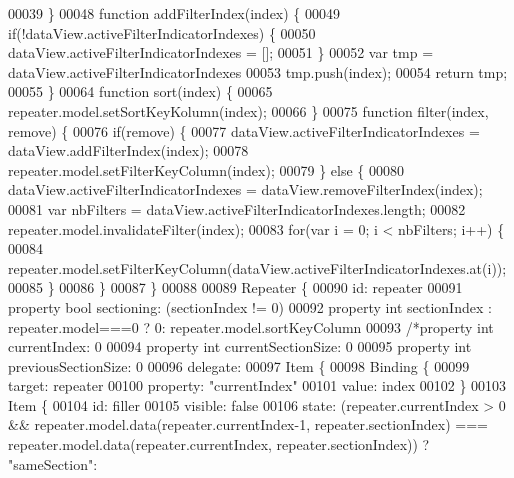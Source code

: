 \begin{DoxyCode}
00039     \}
00048     \textcolor{keyword}{function} addFilterIndex(index) \{
00049         \textcolor{keywordflow}{if}(!dataView.activeFilterIndicatorIndexes) \{
00050             dataView.activeFilterIndicatorIndexes = [];
00051         \}
00052         var tmp = dataView.activeFilterIndicatorIndexes
00053         tmp.push(index);
00054         \textcolor{keywordflow}{return} tmp;
00055     \}
00064     \textcolor{keyword}{function} sort(index) \{
00065         repeater.model.setSortKeyKolumn(index);
00066     \}
00075     \textcolor{keyword}{function} filter(index, \textcolor{keyword}{remove}) \{
00076         \textcolor{keywordflow}{if}(\textcolor{keyword}{remove}) \{
00077             dataView.activeFilterIndicatorIndexes = dataView.addFilterIndex(index);
00078             repeater.model.setFilterKeyColumn(index);
00079         \} \textcolor{keywordflow}{else} \{
00080             dataView.activeFilterIndicatorIndexes = dataView.removeFilterIndex(index);
00081             var nbFilters = dataView.activeFilterIndicatorIndexes.length;
00082             repeater.model.invalidateFilter(index);
00083             \textcolor{keywordflow}{for}(var i = 0; i < nbFilters; i++) \{
00084                 repeater.model.setFilterKeyColumn(dataView.activeFilterIndicatorIndexes.at(i));
00085             \}
00086         \}
00087     \}
00088 
00089     Repeater \{
00090         \textcolor{keywordtype}{id}: repeater
00091         \textcolor{keyword}{property} \textcolor{keywordtype}{bool} sectioning: (sectionIndex != 0)
00092         property \textcolor{keywordtype}{int} sectionIndex : repeater.model===0 ? 0: repeater.model.sortKeyColumn
00093         \textcolor{comment}{/*property int currentIndex: 0}
00094 \textcolor{comment}{        property int currentSectionSize: 0}
00095 \textcolor{comment}{        property int previousSectionSize: 0}
00096 \textcolor{comment}{        delegate:}
00097 \textcolor{comment}{            Item \{}
00098 \textcolor{comment}{            Binding \{}
00099 \textcolor{comment}{                target: repeater}
00100 \textcolor{comment}{                property: "currentIndex"}
00101 \textcolor{comment}{                value: index}
00102 \textcolor{comment}{            \}}
00103 \textcolor{comment}{            Item \{}
00104 \textcolor{comment}{                id: filler}
00105 \textcolor{comment}{                visible: false}
00106 \textcolor{comment}{                state: (repeater.currentIndex > 0 && repeater.model.data(repeater.currentIndex-1,
       repeater.sectionIndex) === repeater.model.data(repeater.currentIndex, repeater.sectionIndex)) ? "sameSection":
}
\end{DoxyCode}
